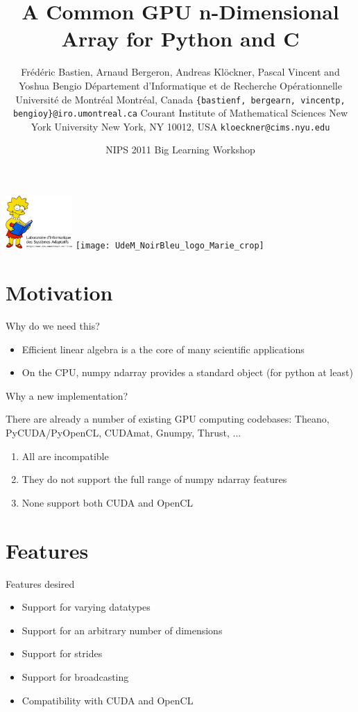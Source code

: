 \documentclass[utf8x,xcolor=pdftex,dvipsnames,table]{beamer}
\title{A Common GPU n-Dimensional Array for Python and C}
\author{
\footnotesize
Frédéric Bastien\superscript{a}, Arnaud Bergeron\superscript{a}, Andreas Klöckner\superscript{b}, \newline
Pascal Vincent\superscript{a} and Yoshua Bengio\superscript{a} \newline \newline
\superscript{a}Département d'Informatique et de Recherche Opérationnelle \newline
Université de Montréal \newline
Montréal, Canada \newline
\texttt{\{bastienf, bergearn, vincentp, bengioy\}@iro.umontreal.ca} \newline \newline
\superscript{b}Courant Institute of Mathematical Sciences \newline
New York University\newline
New York, NY 10012, USA\newline
\texttt{kloeckner@cims.nyu.edu}
}
\date{NIPS 2011 Big Learning Workshop}
\begin{document}
\begin{frame}[plain]
 \titlepage
 \vspace{-5em}
 \includegraphics[width=1in]{lisabook_logo_text_3.png}
 \hfill
 \texttt{[image: UdeM\_NoirBleu\_logo\_Marie\_crop]}
\end{frame}

\setcounter{page}{1}

\section{Motivation}

\begin{frame}{Why do we need this?}
\begin{itemize}
\item Efficient linear algebra is a the core of many scientific applications
\item On the CPU, numpy ndarray provides a standard object (for python at least)
\end{itemize}
\end{frame}

\begin{frame}{Why a new implementation?}
\begin{block}{There are already a number of existing GPU computing codebases:}
Theano, PyCUDA/PyOpenCL, CUDAmat, Gnumpy, Thrust, ...
\end {block}
\begin{enumerate}
\item<2-> All are incompatible
\item<3-> They do not support the full range of numpy ndarray features
\item<4-> None support both CUDA and OpenCL
\end{enumerate}
\end{frame}

\section{Features}
\begin{frame}{Features desired}
\begin{itemize}
\item Support for varying datatypes
\item Support for an arbitrary number of dimensions
\item Support for strides
\item Support for broadcasting
\item Compatibility with CUDA and OpenCL
\end{itemize}
\end{frame}
\end{document}

